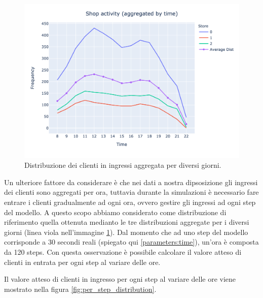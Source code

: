 \begin{figure}[H]
	\centering
	\includegraphics[width=14cm]{"images/shop_activity_aggregated.png"}
	\caption{Distribuzione dei clienti in ingressi aggregata per diversi giorni.}
	\label{fig:shop_activity_aggregated}
\end{figure}


Un ulteriore fattore da considerare è che nei dati a nostra dipsosizione gli ingressi dei clienti sono aggregati per ora, tuttavia durante la simulazioni è necessario fare entrare i clienti gradualmente ad ogni ora, ovvero gestire gli ingressi ad ogni step del modello. A questo scopo abbiamo considerato come distribuzione di riferimento quella ottenuta medianto le tre distribuzioni aggregate per i diversi giorni (linea viola nell'immagine \ref{fig:shop_activity_aggregated}). Dal momento che ad uno step del modello corrisponde a 30 secondi reali (spiegato qui \ref{parameters:time}), un'ora è composta da 120 steps. Con questa osservazione è possibile calcolare il valore atteso di clienti in entrata per ogni step al variare delle ore.

Il valore atteso di clienti in ingresso per ogni step al variare delle ore viene mostrato nella figura \ref{fig:per_step_distribution}.

